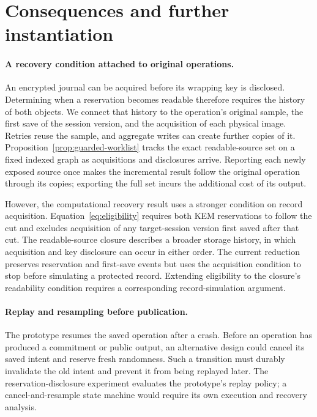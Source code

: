 \section{Consequences and further instantiation}
\label{sec:discussion}

\paragraph{A recovery condition attached to original operations.}
An encrypted journal can be acquired before its wrapping key is
disclosed. Determining when a reservation becomes readable therefore
requires the history of both objects. We connect that history to the
operation's original sample, the first save of the session version,
and the acquisition of each physical image. Retries reuse the sample,
and aggregate writes can create further copies of it.
Proposition~\ref{prop:guarded-worklist} tracks the exact readable-source
set on a fixed indexed graph as acquisitions and disclosures arrive.
Reporting each newly exposed source once makes the incremental result
follow the original operation through its copies; exporting the full
set incurs the additional cost of its output.

However, the computational recovery result uses a stronger condition on
record acquisition.
Equation~\eqref{eq:eligibility} requires both
KEM reservations to follow the cut and excludes acquisition of any target-session version first
saved after that cut. The readable-source closure describes a broader
storage history, in which acquisition and key disclosure can occur in
either order. The current reduction preserves reservation and first-save
events but uses the acquisition condition to stop before simulating a
protected record. Extending eligibility to the closure's readability
condition requires a corresponding record-simulation argument.

\paragraph{Replay and resampling before publication.}
The prototype resumes the saved operation after a crash. Before an
operation has produced a commitment or public output, an alternative
design could cancel its saved intent and reserve fresh randomness. Such
a transition must durably invalidate the old intent and prevent it from
being replayed later. The reservation-disclosure experiment evaluates the
prototype's replay policy; a cancel-and-resample state machine would
require its own execution and recovery analysis.

